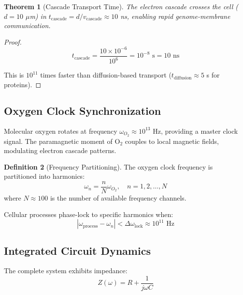 \documentclass[11pt,twocolumn,a4paper]{article}
\newtheorem{theorem}{Theorem}[section]
\theoremstyle{definition}
\newtheorem{definition}[theorem]{Definition}
\theoremstyle{remark}
\begin{document}
\begin{theorem}[Cascade Transport Time]
\label{thm:cascade_time}
The electron cascade crosses the cell ($d = 10$ $\mu$m) in $t_{\mathrm{cascade}} = d/v_{\mathrm{cascade}} \approx 10$ ns, enabling rapid genome-membrane communication.
\end{theorem}

\begin{proof}
\begin{equation}
t_{\mathrm{cascade}} = \frac{10 \times 10^{-6}}{10^6} = 10^{-8} \text{ s} = 10 \text{ ns}
\end{equation}

This is $10^{11}$ times faster than diffusion-based transport ($t_{\mathrm{diffusion}} \approx 5$ s for proteins).
\end{proof}
\subsection{Oxygen Clock Synchronization}

Molecular oxygen rotates at frequency $\omega_{O_2} \approx 10^{13}$ Hz, providing a master clock signal. The paramagnetic moment of O$_2$ couples to local magnetic fields, modulating electron cascade patterns.

\begin{definition}[Frequency Partitioning]
\label{def:frequency_partition_field}
The oxygen clock frequency is partitioned into harmonics:
\begin{equation}
\omega_n = \frac{n}{N} \omega_{O_2}, \quad n = 1, 2, \ldots, N
\label{eq:frequency_harmonics}
\end{equation}
where $N \approx 100$ is the number of available frequency channels.
\end{definition}

Cellular processes phase-lock to specific harmonics when:
\begin{equation}
|\omega_{\mathrm{process}} - \omega_n| < \Delta\omega_{\mathrm{lock}} \approx 10^{11} \text{ Hz}
\label{eq:phase_lock_condition}
\end{equation}
\subsection{Integrated Circuit Dynamics}

The complete system exhibits impedance:
\begin{equation}
Z(\omega) = R + \frac{1}{j\omega C}
\label{eq:circuit_impedance}
\end{equation}
\end{document}
